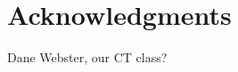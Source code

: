 \documentclass{acm_proc_article-sp}
\begin{document}

\section{Acknowledgments}
Dane Webster, our CT class?

%

%
%
\end{document}
